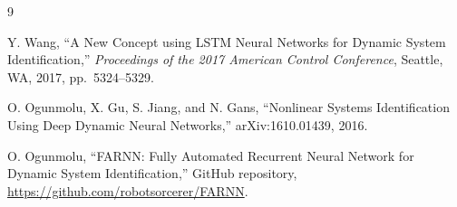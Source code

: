 \documentclass[11pt]{article}
\begin{document}
\begin{thebibliography}{9}

Y. Wang,
``A New Concept using LSTM Neural Networks for Dynamic System Identification,''
\emph{Proceedings of the 2017 American Control Conference},
Seattle, WA, 2017, pp.~5324--5329.

O. Ogunmolu, X. Gu, S. Jiang, and N. Gans,
``Nonlinear Systems Identification Using Deep Dynamic Neural Networks,''
arXiv:1610.01439, 2016.

O. Ogunmolu,
``FARNN: Fully Automated Recurrent Neural Network for Dynamic System Identification,''
GitHub repository,
\url{https://github.com/robotsorcerer/FARNN}.

\end{thebibliography}
\end{document}
